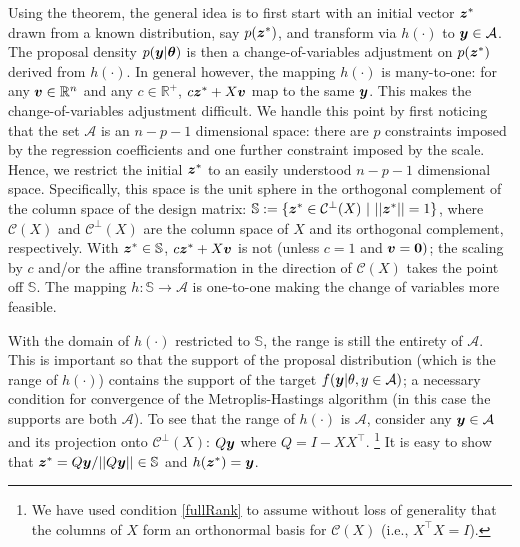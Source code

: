 \documentclass[ba]{imsart}
\def\bth{\mbox{\boldmath $\theta$}}
\newcommand{\by}{\mbox{\boldmath $y$}}
\newcommand{\bz}{\mbox{\boldmath $z$}}
\newcommand{\bv}{\mbox{\boldmath $v$}}
\newcommand{\bb}{\mbox{\boldmath $b$}}
\newcommand{\mc}{\mathcal}
\begin{document}
Using the theorem, the general idea is to first start with an initial vector $\bz^*$ drawn from a known distribution, say $p(\bz^*)$, and transform via $h(\cdot)$ to $\by \in \mathcal{A}$. The proposal density $p(\by|\bth)$ is then a change-of-variables adjustment on $p(\bz^*)$ derived from $h(\cdot)$.
In general however, the mapping $h(\cdot)$ is many-to-one: for any $\bv\in \mathbb{R}^{n}$ and any $c\in \mathbb{R}^{+}$, $c\bz^{*} + X\bv$ map to the same $\by$. This makes the change-of-variables adjustment difficult.
We handle this point by first noticing that the set $\mathcal{A}$ is an $n - p - 1$ dimensional space:  there are $p$ constraints imposed by the regression coefficients and one further constraint imposed by the scale. Hence, we restrict the initial $\bz^*$ to an easily understood $n - p - 1$ dimensional space.  Specifically, this space is  the unit sphere in the orthogonal complement of the column space of the design matrix: $\mathbb{S} := \{\bz^* \in \mathcal{C}^{\perp}(X)\  |\  ||\bz^*|| = 1\}$, where $\mathcal{C}(X)$ and  $\mathcal{C}^{\perp}(X)$ are the column space of $X$ and its orthogonal complement, respectively. With $\bz^{*}\in \mathbb{S}$, $c\bz^{*} + X\bv$ is not (unless $c=1$ and $\bv = \mathbf{0})$; the scaling by $c$ and/or the affine transformation in the direction of $\mathcal{C}(X)$ takes the point off $\mathbb{S}$. The mapping $h: \mathbb{S} \rightarrow \mathcal{A}$ is one-to-one making the change of variables more feasible. 

With the domain of $h(\cdot)$ restricted to  $\mathbb{S}$, the range is still the entirety of $\mathcal{A}$. This is important so that the support of the proposal distribution (which is the range of $h(\cdot)$) contains the support of the target  $f(\by | \theta, y\in \mathcal{A})$; a necessary condition for convergence of the Metroplis-Hastings algorithm (in this case the supports are both $\mathcal{A}$). To see that the range of $h(\cdot)$ is $\mathcal{A}$, consider any $\by \in \mathcal{A}$ and its projection onto $\mathcal{C}^{\perp}(X)$: $Q\by$ where $Q = I - XX^{\top}$. \footnote{We have used condition \ref{fullRank} to assume  without loss of generality  that the columns of $X$ form an orthonormal basis for $\mc{C}(X)$ (i.e., $X^\top X=I$).} It is easy to show that $\bz^{*} = Q\by/||Q\by|| \in \mathbb{S}$ and $h(\bz^{*}) = \by$.
\end{document}
